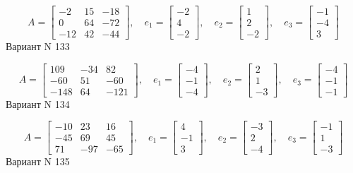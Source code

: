 \documentclass[11pt]{report}
\begin{document}
$$A = \left[\begin{matrix}-2 & 15 & -18\\0 & 64 & -72\\-12 & 42 & -44\end{matrix}\right],\quad e_1 = \left[\begin{matrix}-2\\4\\-2\end{matrix}\right],\quad e_2 = \left[\begin{matrix}1\\2\\-2\end{matrix}\right],\quad e_3 = \left[\begin{matrix}-1\\-4\\3\end{matrix}\right]$$Вариант N 133

$$A = \left[\begin{matrix}109 & -34 & 82\\-60 & 51 & -60\\-148 & 64 & -121\end{matrix}\right],\quad e_1 = \left[\begin{matrix}-4\\-1\\-4\end{matrix}\right],\quad e_2 = \left[\begin{matrix}2\\1\\-3\end{matrix}\right],\quad e_3 = \left[\begin{matrix}-4\\-1\\-1\end{matrix}\right]$$Вариант N 134

$$A = \left[\begin{matrix}-10 & 23 & 16\\-45 & 69 & 45\\71 & -97 & -65\end{matrix}\right],\quad e_1 = \left[\begin{matrix}4\\-1\\3\end{matrix}\right],\quad e_2 = \left[\begin{matrix}-3\\2\\-4\end{matrix}\right],\quad e_3 = \left[\begin{matrix}-1\\1\\-3\end{matrix}\right]$$Вариант N 135
\end{document}
